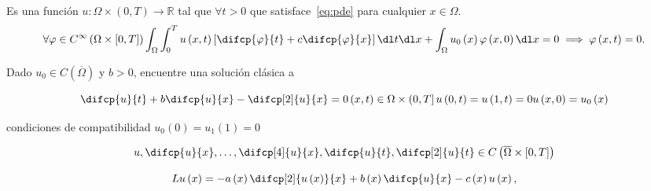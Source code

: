 \begin{definition}
    Es una función $u\colon\Omega\times\left(0,T\right)\to\mathbb{R}$ tal que $\forall t>0$
    que satisface~\eqref{eq:pde} para cualquier $x\in\Omega$.
    \begin{equation*}
        \forall\varphi\in C^{\infty}\left(\Omega\times\left[0,T\right]\right)
        \int_{\Omega}
        \int_{0}^{T}
        u\left(x,t\right)
        \left[
            \difcp{\varphi}{t}+
            c\difcp{\varphi}{x}
            \right]
        \dl t
        \dl x+
        \int_{\Omega}
        u_{0}\left(x\right)
        \varphi\left(x,0\right)
        \dl x=
        0
        \implies
        \varphi\left(x,t\right)=0.
    \end{equation*}
\end{definition}


Dado $u_{0}\in C\left(\overline{\Omega}\right)$ y $b>0$, encuentre una solución clásica a

\begin{equation*}
    \difcp{u}{t}+
    b\difcp{u}{x}-
    \difcp[2]{u}{x}=0
    \left(x,t\right)\in\Omega\times\left(0,T\right]
    u\left(0,t\right)=u\left(1,t\right)=0
    u\left(x,0\right)=u_{0}\left(x\right)
\end{equation*}

condiciones de compatibilidad $u_{0}\left(0\right)=u_{1}\left(1\right)=0$

\begin{equation*}
    u,
    \difcp{u}{x},\dotsc,
    \difcp[4]{u}{x},
    \difcp{u}{t},
    \difcp[2]{u}{t}\in
    C\left(\overline{\Omega}\times\left[0,T\right]\right)
\end{equation*}

\begin{equation*}
    Lu\left(x\right)=
    -a\left(x\right)
    \difcp[2]{u\left(x\right)}{x}+
    b\left(x\right)\difcp{u}{x}-
    c\left(x\right)u\left(x\right),
\end{equation*}
